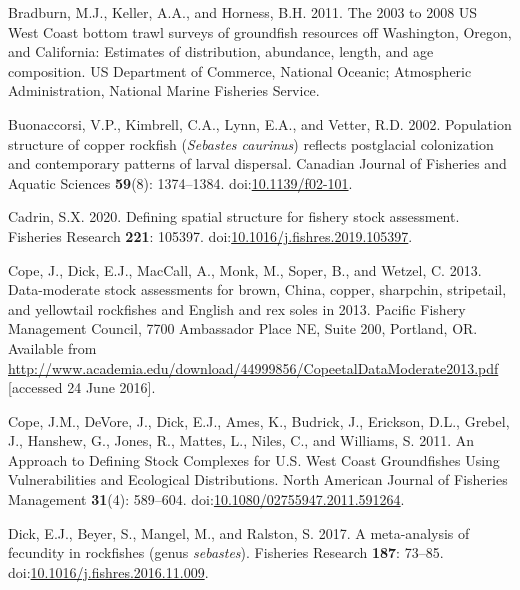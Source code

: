 \documentclass[11pt,
  english,
  letterpaper,
]{article}
\newlength{\cslhangindent}
\newenvironment{CSLReferences}[2] %
 {%
  \setlength{\parindent}{0pt}
  \ifodd #1 \everypar{\setlength{\hangindent}{\cslhangindent}}\ignorespaces\fi
  \ifnum #2 > 0
  \setlength{\parskip}{#2\baselineskip}
  \fi
 }%
 {}
\begin{document}
\begin{CSLReferences}{1}{0}
\leavevmode{}%
Bradburn, M.J., Keller, A.A., and Horness, B.H. 2011. The 2003 to 2008 {US} {West} {Coast} bottom trawl surveys of groundfish resources off {Washington}, {Oregon}, and {California}: Estimates of distribution, abundance, length, and age composition. US Department of Commerce, National Oceanic; Atmospheric Administration, National Marine Fisheries Service.

\leavevmode{}%
Buonaccorsi, V.P., Kimbrell, C.A., Lynn, E.A., and Vetter, R.D. 2002. Population structure of copper rockfish (\emph{{Sebastes} caurinus}) reflects postglacial colonization and contemporary patterns of larval dispersal. Canadian Journal of Fisheries and Aquatic Sciences \textbf{59}(8): 1374--1384. doi:\href{https://doi.org/10.1139/f02-101}{10.1139/f02-101}.

\leavevmode{}%
Cadrin, S.X. 2020. Defining spatial structure for fishery stock assessment. Fisheries Research \textbf{221}: 105397. doi:\href{https://doi.org/10.1016/j.fishres.2019.105397}{10.1016/j.fishres.2019.105397}.

\leavevmode{}%
Cope, J., Dick, E.J., MacCall, A., Monk, M., Soper, B., and Wetzel, C. 2013. Data-moderate stock assessments for brown, {China}, copper, sharpchin, stripetail, and yellowtail rockfishes and {English} and rex soles in 2013. Pacific Fishery Management Council, 7700 Ambassador Place NE, Suite 200, Portland, OR. Available from \url{http://www.academia.edu/download/44999856/CopeetalDataModerate2013.pdf} {[}accessed 24 June 2016{]}.

\leavevmode{}%
Cope, J.M., DeVore, J., Dick, E.J., Ames, K., Budrick, J., Erickson, D.L., Grebel, J., Hanshew, G., Jones, R., Mattes, L., Niles, C., and Williams, S. 2011. An {Approach} to {Defining} {Stock} {Complexes} for {U}.{S}. {West} {Coast} {Groundfishes} {Using} {Vulnerabilities} and {Ecological} {Distributions}. North American Journal of Fisheries Management \textbf{31}(4): 589--604. doi:\href{https://doi.org/10.1080/02755947.2011.591264}{10.1080/02755947.2011.591264}.

\leavevmode{}%
Dick, E.J., Beyer, S., Mangel, M., and Ralston, S. 2017. A meta-analysis of fecundity in rockfishes (genus \emph{sebastes}). Fisheries Research \textbf{187}: 73--85. doi:\href{https://doi.org/10.1016/j.fishres.2016.11.009}{10.1016/j.fishres.2016.11.009}.


\end{CSLReferences}
\end{document}
